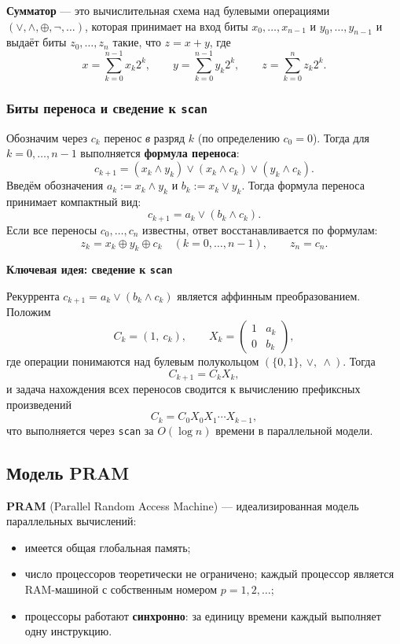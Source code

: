 \begin{Definition}{}{}
	\textbf{Сумматор} — это вычислительная схема над булевыми операциями $(\vee, \wedge, \oplus, \neg, \dots)$, которая принимает на вход биты $x_0, \dots, x_{n-1}$ и $y_0, \dots, y_{n-1}$ и выдаёт биты $z_0, \dots, z_n$ такие, что $z = x + y$, где
	\[
	x = \sum_{k=0}^{n-1} x_k 2^k, \qquad
	y = \sum_{k=0}^{n-1} y_k 2^k, \qquad
	z = \sum_{k=0}^{n} z_k 2^k.
	\]
\end{Definition}

\subsubsection*{Биты переноса и сведение к \texttt{scan}}

Обозначим через $c_k$ перенос \emph{в} разряд $k$ (по определению $c_0 = 0$). Тогда для $k = 0, \dots, n-1$ выполняется \textbf{формула переноса}:
\[
c_{k+1} = (x_k \wedge y_k) \vee (x_k \wedge c_k) \vee (y_k \wedge c_k).
\]
Введём обозначения $a_k := x_k \wedge y_k$ и $b_k := x_k \vee y_k$. Тогда формула переноса принимает компактный вид:
\[
c_{k+1} = a_k \vee (b_k \wedge c_k).
\]
Если все переносы $c_0, \dots, c_n$ известны, ответ восстанавливается по формулам:
\[
z_k = x_k \oplus y_k \oplus c_k \quad (k = 0, \dots, n-1), \qquad z_n = c_n.
\]

\textbf{Ключевая идея: сведение к \texttt{scan}}

	Рекуррента $c_{k+1} = a_k \vee (b_k \wedge c_k)$ является аффинным преобразованием. Положим
	\[
	C_k = (1,\ c_k), \qquad
	X_k = \begin{pmatrix} 1 & a_k \\ 0 & b_k \end{pmatrix},
	\]
	где операции понимаются над булевым полукольцом $(\{0,1\},\ \vee,\ \wedge)$. Тогда
	\[
	C_{k+1} = C_k X_k,
	\]
	и задача нахождения всех переносов сводится к вычислению префиксных произведений
	\[
	C_k = C_0 X_0 X_1 \cdots X_{k-1},
	\]
	что выполняется через \texttt{scan} за $O(\log n)$ времени в параллельной модели.


\subsection{Модель PRAM}

\begin{Definition}{}{}
	\textbf{PRAM} (Parallel Random Access Machine) — идеализированная модель параллельных вычислений:
	\begin{itemize}
		\item имеется общая глобальная память;
		\item число процессоров теоретически не ограничено; каждый процессор является RAM-машиной с собственным номером $p = 1, 2, \dots$;
		\item процессоры работают \textbf{синхронно}: за единицу времени каждый выполняет одну инструкцию.
	\end{itemize}
\end{Definition}


